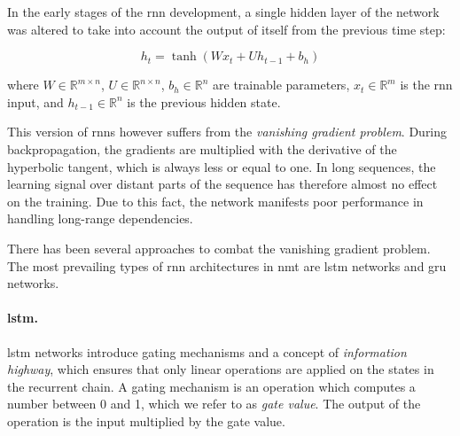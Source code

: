 In the early stages of the \gls{rnn} development, a single hidden layer of the
network was altered to take into account the output of itself from the previous
time step:

%

\begin{equation} h_t = \tanh ( W x_t + U h_{t-1} + b_h ) \label{eq:vanilla-rnn}
\end{equation}

\noindent where $W \in \mathbb{R}^{m \times n}$, $U \in \mathbb{R}^{n \times
n}$, $b_h \in \mathbb{R}^{n}$ are trainable parameters, $x_t \in \mathbb{R}^{m}$
is the \gls{rnn} input, and $h_{t-1} \in \mathbb{R}^{n}$ is the previous hidden
state.

This version of \glspl{rnn} however suffers from the \emph{vanishing gradient
problem}. During backpropagation, the gradients are multiplied with the
derivative of the hyperbolic tangent, which is always less or equal to one. In
long sequences, the learning signal over distant parts of the sequence has
therefore almost no effect on the training. Due to this fact, the network
manifests poor performance in handling long-range dependencies.

There has been several approaches to combat the vanishing gradient problem.  The
most prevailing types of \gls{rnn} architectures in \gls{nmt} are \gls{lstm}
networks and \gls{gru} networks.

\paragraph{\acrshort{lstm}.} \acrlong{lstm} networks \citep{hochreiter1997long}
introduce gating mechanisms and a concept of \emph{information highway}, which
ensures that only linear operations are applied on the states in the recurrent
chain. A gating mechanism is an operation which computes a number between 0 and
1, which we refer to as \emph{gate value}.  The output of the operation is the
input multiplied by the gate value.


